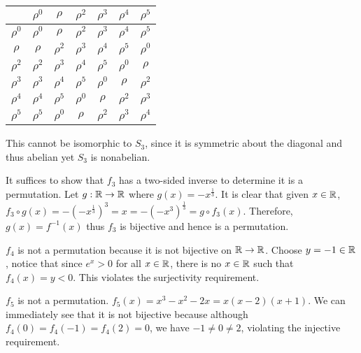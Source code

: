 \documentclass[12pt]{article}
\begin{document}
\begin{problem}[8.20]
~\begin{table}[H]
	\centering
	\begin{tabular}{c||c|c|c|c|c|c}
		& $ \rho^0$ & $ \rho$ & $ \rho^2$ & $ \rho^3$ & $ \rho^{4}$ & $ \rho^{5}$\\
		\hline
		\hline
		$ \rho^0$&$ \rho^0$&$ \rho$&$ \rho^2$&$ \rho^3$&$ \rho^{4}$&$ \rho^{5}$\\
		\hline
	        $ \rho$&$ \rho$&$ \rho^2$&$ \rho^3$&$ \rho^{4}$&$ \rho^{5}$ & $ \rho^{0}$\\
		\hline
		$ \rho^2$ &$ \rho^2$&$ \rho^3$&$ \rho^{4}$&$ \rho^{5}$ & $ \rho^{0}$ & $ \rho$\\
		\hline
$ \rho^3$ &$ \rho^3$&$ \rho^{4}$&$ \rho^{5}$ & $ \rho^{0}$ & $ \rho$&$ \rho^2$\\
\hline
$ \rho^4$ &$ \rho^{4}$&$ \rho^{5}$ & $ \rho^{0}$ & $ \rho$&$ \rho^2$&$ \rho^3$\\
\hline
$ \rho^5$ &$ \rho^{5}$ & $ \rho^{0}$ & $ \rho$&$ \rho^2$&$ \rho^3$&$ \rho^{4}$\\
	\end{tabular}
\end{table}
This cannot be isomorphic to $ S_3$, since it is symmetric about the diagonal and thus abelian yet $ S_3$ is nonabelian.
\end{problem}
\begin{problem}[8.32]
	It suffices to show that $ f_3$ has a two-sided inverse to determine it is a permutation. Let $ g: \mathbb{R} \to \mathbb{R}$ where $g(x) = -x^{\frac{1}{3}}$. It is clear that given $ x \in \mathbb{R}$, $ f_3 \circ g (x) = -\left( -x^{\frac{1}{3}} \right)^3 = x = -\left( -x^3 \right) ^{\frac{1}{3}} = g \circ f_3(x)$. Therefore, $ g(x) = f^{-1}(x)$ thus $ f_3$ is bijective and hence is a permutation.
\end{problem}

\begin{problem}[8.33]
	$ f_4$ is not a permutation because it is not bijective on  $ \mathbb{R} \to \mathbb{R}$. Choose $ y=-1 \in \mathbb{R}$, notice that since $ e^{x}>0$ for all $ x \in \mathbb{R}$, there is no $ x \in \mathbb{R}$ such that $ f_4(x) = y<0$. This violates the surjectivity requirement. 
\end{problem}

\begin{problem}[8.34]
	$ f_5$ is not a permutation. $ f_5(x)=x^3-x^2-2x = x(x-2)(x+1)$. We can immediately see that it is not bijective because although $ f_4(0)=f_4(-1)=f_4(2)=0$, we have  $ -1 \neq 0 \neq 2$, violating the injective requirement.
\end{problem}
\end{document}
